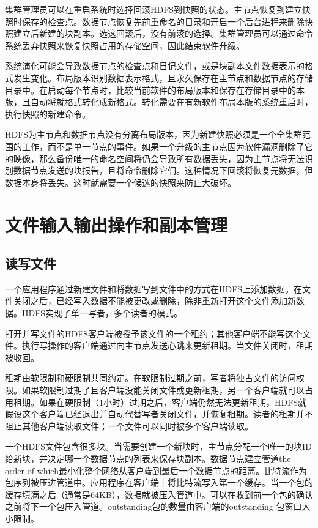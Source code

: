集群管理员可以在重启系统时选择回滚HDFS到快照的状态。主节点恢复到建立快照时保存的检查点。数据节点恢复先前重命名的目录和开启一个后台进程来删除快照建立后新建的块副本。选这回滚后，没有前滚的选择。集群管理员可以通过命令系统丢弃快照来恢复快照占用的存储空间，因此结束软件升级。

系统演化可能会导致数据节点的检查点和日记文件，或是块副本文件数据表示的格式发生变化。布局版本识别数据表示格式，且永久保存在主节点和数据节点的存储目录中。在启动每个节点时，比较当前软件的布局版本和保存在存储目录中的本版，且自动将就格式转化成新格式。转化需要在有新软件布局本版的系统重启时，执行快照的新建命令。

HDFS为主节点和数据节点没有分离布局版本，因为新建快照必须是一个全集群范围的工作，而不是单一节点的事件。如果一个升级的主节点因为软件漏洞删除了它的映像，那么备份唯一的命名空间将仍会导致所有数据丢失，因为主节点将无法识别数据节点发送的块报告，且将命令删除它们。这种情况下回滚将恢复元数据，但数据本身将丢失。这时就需要一个候选的快照来防止大破坏。

\section{文件输入输出操作和副本管理}

\subsection{读写文件}

一个应用程序通过新建文件和将数据写到文件中的方式在HDFS上添加数据。在文件关闭之后，已经写入数据不能被更改或删除，除非重新打开这个文件添加新数据。HDFS实现了单一写者，多个读者的模式。

打开并写文件的HDFS客户端被授予该文件的一个租约；其他客户端不能写这个文件。执行写操作的客户端通过向主节点发送心跳来更新租期。当文件关闭时，租期被收回。

租期由软限制和硬限制共同约定。在软限制过期之前，写者将独占文件的访问权限。如果软限制过期了且客户端没能关闭文件或更新租期，另一个客户端就可以占用租期。如果在硬限制（1小时）过期之后，客户端仍然无法更新租期，HDFS就假设这个客户端已经退出并自动代替写者关闭文件，并恢复租期。读者的租期并不阻止其他客户端读取文件；一个文件可以同时被多个客户端读取。

一个HDFS文件包含很多块。当需要创建一个新块时，主节点分配一个唯一的块ID给新块，并决定哪一个数据节点的列表来保存块副本。数据节点建立管道the order of which最小化整个网络从客户端到最后一个数据节点的距离。比特流作为包序列被压进管道中。应用程序在客户端上将比特流写入第一个缓存。当一个包的缓存填满之后（通常是64KB），数据就被压入管道中。可以在收到前一个包的确认之前将下一个包压入管道。outstanding包的数量由客户端的outstanding 包窗口大小限制。

